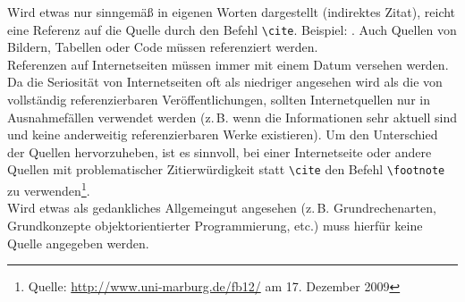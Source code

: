 Wird etwas nur sinngemäß in eigenen Worten dargestellt (indirektes Zitat), reicht eine Referenz auf die Quelle durch den Befehl \texttt{\textbackslash cite}. Beispiel: \cite{bib:hoppePM}. Auch Quellen von Bildern, Tabellen oder Code müssen referenziert werden. \\


Referenzen auf Internetseiten müssen immer mit einem Datum versehen werden. Da die Seriosität von Internetseiten oft als niedriger angesehen wird als die von vollständig referenzierbaren Veröffentlichungen, sollten Internetquellen nur in Ausnahmefällen verwendet werden (\mbox{z.\,B.} wenn die Informationen sehr aktuell sind und keine anderweitig referenzierbaren Werke existieren). Um den Unterschied der Quellen hervorzuheben, ist es sinnvoll, bei einer Internetseite oder andere Quellen mit problematischer Zitierwürdigkeit statt \texttt{\textbackslash cite} den Befehl \texttt{\textbackslash footnote} zu verwenden\footnote{Quelle: \url{http://www.uni-marburg.de/fb12/} am 17. Dezember 2009}. \\

Wird etwas als gedankliches Allgemeingut angesehen (\mbox{z.\,B.} Grundrechenarten, Grundkonzepte objektorientierter Programmierung, etc.) muss hierfür keine Quelle angegeben werden.


